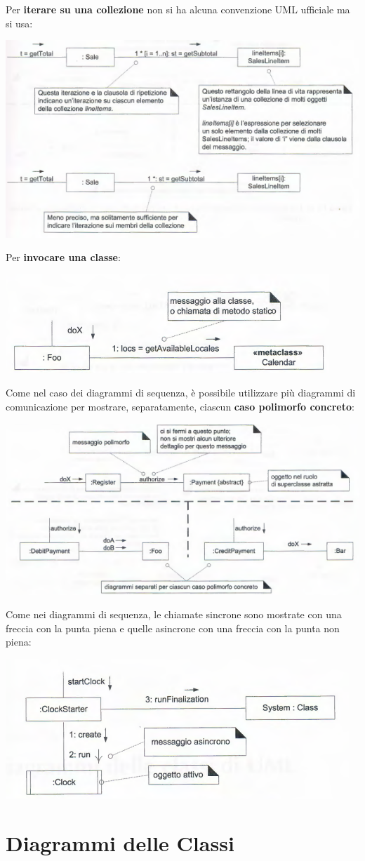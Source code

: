 \documentclass[a4paper,12pt, oneside]{book}
\begin{document}
Per \textbf{iterare su una collezione} non si ha alcuna convenzione UML ufficiale ma si usa:
\begin{center}
	\includegraphics[scale=0.6]{img/umd9.png}
\end{center}
Per \textbf{invocare una classe}:
\begin{center}
	\includegraphics[scale=0.7]{img/comd9.png}
\end{center}
Come nel caso dei diagrammi di sequenza, è possibile
utilizzare più diagrammi di comunicazione per mostrare, separatamente, ciascun \textbf{caso polimorfo concreto}:
\begin{center}
	\includegraphics[scale=0.7]{img/comd10.png}
\end{center}
Come nei diagrammi di sequenza, le chiamate sincrone sono mostrate con una freccia con 
la punta piena e quelle asincrone con una freccia con la punta non piena:
\begin{center}
	\includegraphics[scale=0.7]{img/comd11.png}
\end{center}
\chapter{Diagrammi delle Classi}
\end{document}
